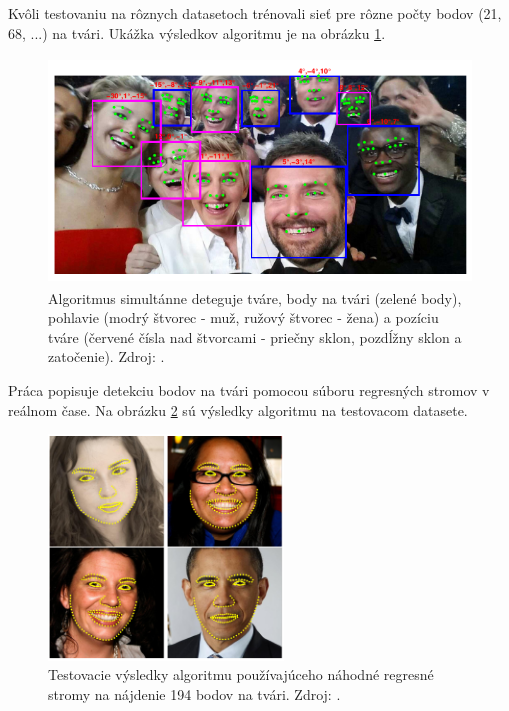 Kvôli testovaniu na rôznych datasetoch trénovali sieť pre rôzne počty bodov (21, 68, ...) na tvári. 
Ukážka výsledkov algoritmu je na obrázku \ref{pic-pic-ranjan2017hyperface-xichty.png}.

\begin{figure}[H]
	\begin{center}
		\includegraphics[height=6cm]{pics/pic-ranjan2017hyperface-xichty.png}
		\caption{Algoritmus simultánne deteguje tváre, body na tvári (zelené body), pohlavie (modrý štvorec - muž, ružový štvorec - žena) a pozíciu tváre (červené čísla nad štvorcami - priečny sklon, pozdĺžny sklon a zatočenie).  
		Zdroj: \cite{ranjan2017hyperface}.}
		\label{pic-pic-ranjan2017hyperface-xichty.png}
	\end{center}
\end{figure}

Práca \cite{kazemi2014one} popisuje detekciu bodov na tvári pomocou súboru regresných stromov v reálnom čase. 
Na obrázku \ref{pic-oneMsBody.png} sú výsledky algoritmu na testovacom datasete.

\begin{figure}[H]
	\begin{center}
		\includegraphics[height=6cm]{pics/oneMsBody.png}
		\caption{Testovacie výsledky algoritmu používajúceho náhodné regresné stromy na nájdenie 194 bodov na tvári. 
		Zdroj: \cite{kazemi2014one}.}
		\label{pic-oneMsBody.png}
	\end{center}
\end{figure}

